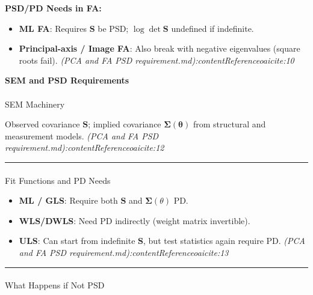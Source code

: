 \documentclass[
  12pt,
]{article}
\makeatletter
\let\oldparagraph\paragraph
\renewcommand{\paragraph}{
    \@ifstar
      \xxxParagraphStar
      \xxxParagraphNoStar
  }
\newcommand{\xxxParagraphStar}[1]{\oldparagraph*{#1}\mbox{}}
\newcommand{\xxxParagraphNoStar}[1]{\oldparagraph{#1}\mbox{}}
\providecommand{\tightlist}{%
  \setlength{\itemsep}{0pt}\setlength{\parskip}{0pt}}
\theoremstyle{plain}
\theoremstyle{definition}
\theoremstyle{remark}
\makeatother
\begin{document}
\textbf{PSD/PD Needs in FA:}

\begin{itemize}
\tightlist
\item
  \textbf{ML FA}: Requires \(\mathbf{S}\) be PSD;
  \(\log \det \mathbf{S}\) undefined if indefinite.
\item
  \textbf{Principal-axis / Image FA}: Also break with negative
  eigenvalues (square roots fail). \emph{(PCA and FA PSD
  requirement.md):contentReference{oaicite:10}}
\end{itemize}

\textbf{SEM and PSD Requirements}

\paragraph{SEM Machinery}\label{sem-machinery}

Observed covariance \(\mathbf{S}\); implied covariance
\(\boldsymbol\Sigma(\boldsymbol\theta)\) from structural and measurement
models. \emph{(PCA and FA PSD
requirement.md):contentReference{oaicite:12}}

\begin{center}\rule{0.5\linewidth}{0.5pt}\end{center}

\paragraph{Fit Functions and PD Needs}\label{fit-functions-and-pd-needs}

\begin{itemize}
\tightlist
\item
  \textbf{ML / GLS}: Require both \(\mathbf{S}\) and
  \(\boldsymbol\Sigma(\theta)\) PD.
\item
  \textbf{WLS/DWLS}: Need PD indirectly (weight matrix invertible).
\item
  \textbf{ULS}: Can start from indefinite \(\mathbf{S}\), but test
  statistics again require PD. \emph{(PCA and FA PSD
  requirement.md):contentReference{oaicite:13}}
\end{itemize}

\begin{center}\rule{0.5\linewidth}{0.5pt}\end{center}

\paragraph{What Happens if Not PSD}\label{what-happens-if-not-psd}
\end{document}
